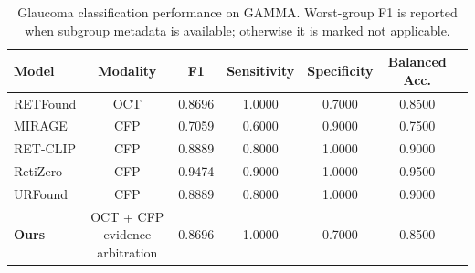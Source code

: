\begin{table}[t]
\centering
\caption{Glaucoma classification performance on GAMMA. Worst-group F1 is reported when subgroup metadata is available; otherwise it is marked not applicable.}
\label{tab:glaucoma_gamma}
\begin{tabular}{lcccccc}
\toprule
\textbf{Model} & \textbf{Modality} & \textbf{F1} & \textbf{Sensitivity} & \textbf{Specificity} & \textbf{Balanced Acc.} \\
\midrule
RETFound & OCT & 0.8696 & 1.0000 & 0.7000 & 0.8500 \\
MIRAGE & CFP & 0.7059 & 0.6000 & 0.9000 & 0.7500 \\
RET-CLIP & CFP & 0.8889 & 0.8000 & 1.0000 & 0.9000 \\
RetiZero & CFP & 0.9474 & 0.9000 & 1.0000 & 0.9500 \\
URFound & CFP & 0.8889 & 0.8000 & 1.0000 & 0.9000 \\
\textbf{Ours} & OCT + CFP evidence arbitration & 0.8696 & 1.0000 & 0.7000 & 0.8500 \\
\bottomrule
\end{tabular}
\end{table}
